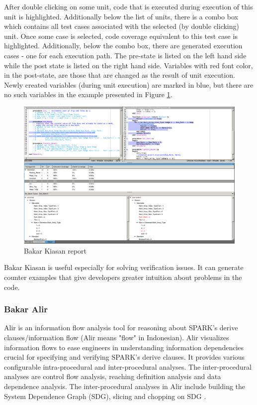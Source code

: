 After double clicking on some unit, code that is executed during execution of this unit is highlighted. Additionally below the list of units, there is a combo box which contains all test cases associated with the selected (by double clicking) unit. Once some case is selected, code coverage equivalent to this test case is highlighted. Additionally, below the combo box, there are generated execution cases - one for each execution path. The pre-state is listed on the left hand side while the post state is listed on the right hand side. Variables with red font color, in the post-state, are those that are changed as the result of unit execution. Newly created variables (during unit execution) are marked in blue, but there are no such variables in the example presented in Figure \ref{figure:kiasan-sample}.

\begin{figure}[ht]%
    \begin{center}
    	\includegraphics[width=1\textwidth]{figures/kiasan-sample.png}    	
    \end{center}
    \caption{Bakar Kiasan report}
    \label{figure:kiasan-sample}
\end{figure}

Bakar Kiasan is useful especially for solving verification issues. It can generate counter examples that give developers greater intuition about problems in the code.


\subsubsection{Bakar Alir}
Alir is an information flow analysis tool for reasoning about SPARK's derive clauses/information flow (Alir means "flow" in Indonesian). Alir visualizes information flows to ease engineers in understanding information dependencies crucial for specifying and verifying SPARK's derive clauses. It provides various configurable intra-procedural and inter-procedural analyses. The inter-procedural analyses are control flow analysis, reaching definition analysis and data dependence analysis. The inter-procedural analyses in Alir include building the System Dependence Graph (SDG), slicing and chopping on SDG \cite{Hari:Thesis}.



